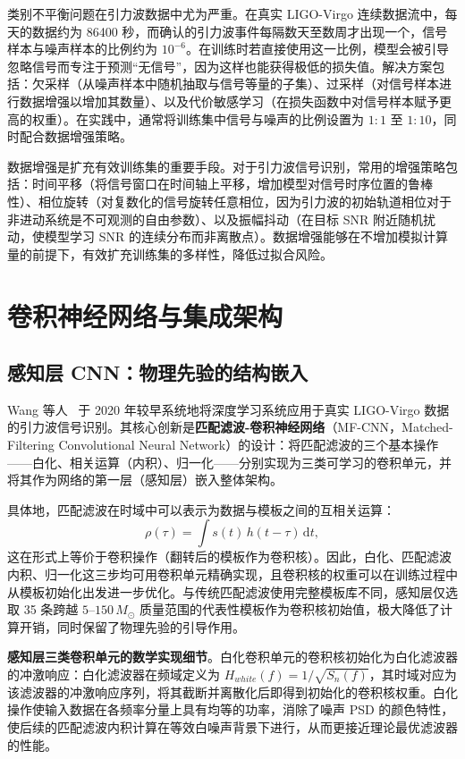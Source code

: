 类别不平衡问题在引力波数据中尤为严重。在真实 LIGO-Virgo 连续数据流中，每天的数据约为 86400 秒，而确认的引力波事件每隔数天至数周才出现一个，信号样本与噪声样本的比例约为 $10^{-6}$。在训练时若直接使用这一比例，模型会被引导忽略信号而专注于预测“无信号”，因为这样也能获得极低的损失值。解决方案包括：欠采样（从噪声样本中随机抽取与信号等量的子集）、过采样（对信号样本进行数据增强以增加其数量）、以及代价敏感学习（在损失函数中对信号样本赋予更高的权重）。在实践中，通常将训练集中信号与噪声的比例设置为 $1:1$ 至 $1:10$，同时配合数据增强策略。

数据增强是扩充有效训练集的重要手段。对于引力波信号识别，常用的增强策略包括：时间平移（将信号窗口在时间轴上平移，增加模型对信号时序位置的鲁棒性）、相位旋转（对复数化的信号旋转任意相位，因为引力波的初始轨道相位对于非进动系统是不可观测的自由参数）、以及振幅抖动（在目标 SNR 附近随机扰动，使模型学习 SNR 的连续分布而非离散点）。数据增强能够在不增加模拟计算量的前提下，有效扩充训练集的多样性，降低过拟合风险。

\section{卷积神经网络与集成架构}

\subsection{感知层 CNN：物理先验的结构嵌入}

Wang 等人~\cite{wang2020deeplearning} 于 2020 年较早系统地将深度学习系统应用于真实 LIGO-Virgo 数据的引力波信号识别。其核心创新是\textbf{匹配滤波-卷积神经网络}（MF-CNN，Matched-Filtering Convolutional Neural Network）的设计：将匹配滤波的三个基本操作——白化、相关运算（内积）、归一化——分别实现为三类可学习的卷积单元，并将其作为网络的第一层（感知层）嵌入整体架构。

具体地，匹配滤波在时域中可以表示为数据与模板之间的互相关运算：
\begin{equation}
  \rho(\tau) = \int s(t)\,h(t - \tau)\,\mathrm{d}t,
\end{equation}
这在形式上等价于卷积操作（翻转后的模板作为卷积核）。因此，白化、匹配滤波内积、归一化这三步均可用卷积单元精确实现，且卷积核的权重可以在训练过程中从模板初始化出发进一步优化。与传统匹配滤波使用完整模板库不同，感知层仅选取 35 条跨越 $5$--$150\,M_\odot$ 质量范围的代表性模板作为卷积核初始值，极大降低了计算开销，同时保留了物理先验的引导作用。

\textbf{感知层三类卷积单元的数学实现细节}。白化卷积单元的卷积核初始化为白化滤波器的冲激响应：白化滤波器在频域定义为 $H_{white}(f) = 1/\sqrt{S_n(f)}$，其时域对应为该滤波器的冲激响应序列，将其截断并离散化后即得到初始化的卷积核权重。白化操作使输入数据在各频率分量上具有均等的功率，消除了噪声 PSD 的颜色特性，使后续的匹配滤波内积计算在等效白噪声背景下进行，从而更接近理论最优滤波器的性能。


